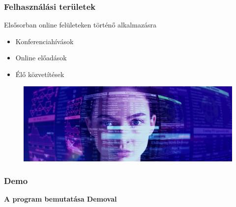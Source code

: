 \documentclass{beamer}
\begin{document}
\begin{frame}[fragile]
\frametitle{Felhasználási területek}

Elsősorban online felületeken történő alkalmazásra

\begin{itemize}
	\item Konferenciahívások
	\item Online előadások
	\item Élő közvetítések
\end{itemize}

\begin{figure}[htb]
	\includegraphics[width=\textwidth]{images/virtual.png}
\end{figure}

\end{frame}

\begin{frame}[fragile]
\frametitle{Demo}

\begin{center}
	\Large
	\textbf{A program bemutatása Demoval}
\end{center}

\end{frame}

\end{document}
